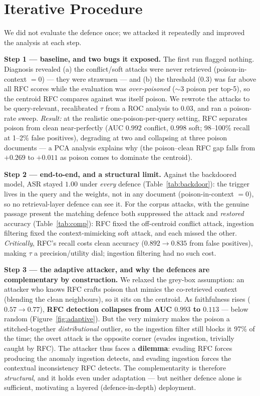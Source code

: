 \documentclass[11pt,a4paper]{article}
\begin{document}
\section{Iterative Procedure}

We did not evaluate the defence once; we attacked it repeatedly and improved the
analysis at each step.

\textbf{Step 1 --- baseline, and two bugs it exposed.} The first run flagged nothing.
Diagnosis revealed (a) the conflict/soft attacks were never retrieved
(poison-in-context $=0$) --- they were strawmen --- and (b) the threshold ($0.3$) was
far above all RFC scores while the evaluation was \emph{over-poisoned} ($\sim$3 poison
per top-5), so the centroid RFC compares against was itself poison. We rewrote the
attacks to be query-relevant, recalibrated $\tau$ from a ROC analysis to $0.03$, and
ran a poison-rate sweep. \emph{Result:} at the realistic one-poison-per-query setting,
RFC separates poison from clean near-perfectly (AUC $0.992$ conflict, $0.998$ soft;
98--100\% recall at 1--2\% false positives), degrading at two and collapsing at three
poison documents --- a PCA analysis explains why (the poison--clean RFC gap falls from
$+0.269$ to $+0.011$ as poison comes to dominate the centroid).

\textbf{Step 2 --- end-to-end, and a structural limit.} Against the backdoored model,
ASR stayed $1.00$ under \emph{every} defence (Table~\ref{tab:backdoor}): the trigger
lives in the query and the weights, not in any document (poison-in-context $=0$), so no
retrieval-layer defence can see it. For the corpus attacks, with the genuine passage
present the matching defence both suppressed the attack and \emph{restored} accuracy
(Table~\ref{tab:comp}): RFC fixed the off-centroid conflict attack, ingestion filtering
fixed the context-mimicking soft attack, and each missed the other. \emph{Critically},
RFC's recall costs clean accuracy ($0.892\rightarrow0.835$ from false positives),
making $\tau$ a precision/utility dial; ingestion filtering had no such cost.

\textbf{Step 3 --- the adaptive attacker, and why the defences are complementary by
construction.} We relaxed the grey-box assumption: an attacker who knows RFC crafts
poison that mimics the co-retrieved context (blending the clean neighbours), so it sits
on the centroid. As faithfulness rises ($0.57\rightarrow0.77$), \textbf{RFC detection
collapses from AUC $0.993$ to $0.113$} --- below random (Figure~\ref{fig:adaptive}).
But the very mimicry makes the poison a stitched-together \emph{distributional} outlier,
so the ingestion filter still blocks it 97\% of the time; the overt attack is the
opposite corner (evades ingestion, trivially caught by RFC). The attacker thus faces a
\textbf{dilemma}: evading RFC forces producing the anomaly ingestion detects, and
evading ingestion forces the contextual inconsistency RFC detects. The complementarity
is therefore \emph{structural}, and it holds even under adaptation --- but neither
defence alone is sufficient, motivating a layered (defence-in-depth) deployment.
\end{document}
